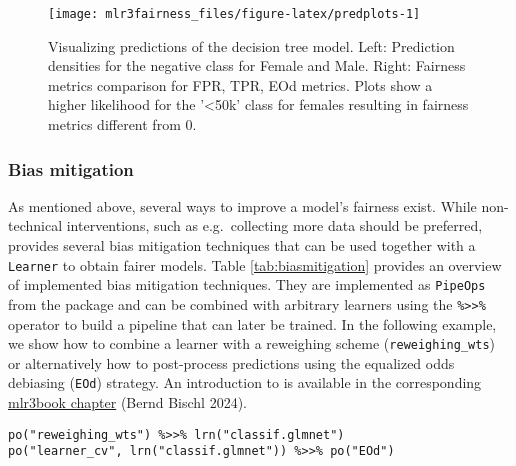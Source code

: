\begin{figure}

{\centering \texttt{[image: mlr3fairness\_files/figure-latex/predplots-1]} 

}

\caption{Visualizing predictions of the decision tree model. Left: Prediction densities for the negative class for Female and Male. Right: Fairness metrics comparison for FPR, TPR, EOd metrics. Plots show a higher likelihood for the '<50k' class for females resulting in fairness metrics different from 0.}\label{fig:predplots}
\end{figure}

\hypertarget{bias-mitigation-1}{%
\subsubsection{Bias mitigation}\label{bias-mitigation-1}}

As mentioned above, several ways to improve a model's fairness exist.
While non-technical interventions, such as e.g.~collecting more data should be preferred,
 provides several bias mitigation techniques that can be used together with a \texttt{Learner} to obtain fairer models.
Table \ref{tab:biasmitigation} provides an overview of implemented bias mitigation techniques.
They are implemented as \texttt{PipeOps} from the  package and can be
combined with arbitrary learners using the \texttt{\%\textgreater{}\textgreater{}\%} operator to build a pipeline that can later be trained.
In the following example, we show how to combine a learner with a reweighing scheme (\texttt{reweighing\_wts}) or alternatively how to post-process predictions using the equalized odds debiasing (\texttt{EOd}) strategy.
An introduction to  is available in the corresponding \href{https://mlr3book.mlr-org.com/pipelines.html}{mlr3book chapter} (Bernd Bischl 2024).

\begin{verbatim}
po("reweighing_wts") %>>% lrn("classif.glmnet")
po("learner_cv", lrn("classif.glmnet")) %>>% po("EOd")
\end{verbatim}

